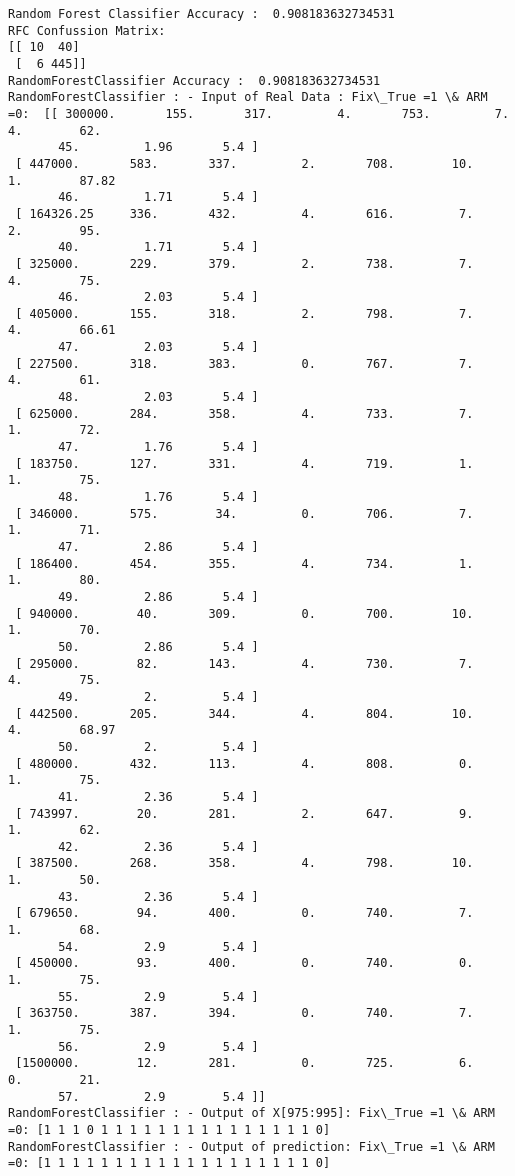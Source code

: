 \documentclass[11pt]{article}
\begin{document}
    \begin{Verbatim}[commandchars=\\\{\}]
Random Forest Classifier Accuracy :  0.908183632734531
RFC Confussion Matrix: 
[[ 10  40]
 [  6 445]]
RandomForestClassifier Accuracy :  0.908183632734531
RandomForestClassifier : - Input of Real Data : Fix\_True =1 \& ARM =0:  [[ 300000.       155.       317.         4.       753.         7.         4.        62.
       45.         1.96       5.4 ]
 [ 447000.       583.       337.         2.       708.        10.         1.        87.82
       46.         1.71       5.4 ]
 [ 164326.25     336.       432.         4.       616.         7.         2.        95.
       40.         1.71       5.4 ]
 [ 325000.       229.       379.         2.       738.         7.         4.        75.
       46.         2.03       5.4 ]
 [ 405000.       155.       318.         2.       798.         7.         4.        66.61
       47.         2.03       5.4 ]
 [ 227500.       318.       383.         0.       767.         7.         4.        61.
       48.         2.03       5.4 ]
 [ 625000.       284.       358.         4.       733.         7.         1.        72.
       47.         1.76       5.4 ]
 [ 183750.       127.       331.         4.       719.         1.         1.        75.
       48.         1.76       5.4 ]
 [ 346000.       575.        34.         0.       706.         7.         1.        71.
       47.         2.86       5.4 ]
 [ 186400.       454.       355.         4.       734.         1.         1.        80.
       49.         2.86       5.4 ]
 [ 940000.        40.       309.         0.       700.        10.         1.        70.
       50.         2.86       5.4 ]
 [ 295000.        82.       143.         4.       730.         7.         4.        75.
       49.         2.         5.4 ]
 [ 442500.       205.       344.         4.       804.        10.         4.        68.97
       50.         2.         5.4 ]
 [ 480000.       432.       113.         4.       808.         0.         1.        75.
       41.         2.36       5.4 ]
 [ 743997.        20.       281.         2.       647.         9.         1.        62.
       42.         2.36       5.4 ]
 [ 387500.       268.       358.         4.       798.        10.         1.        50.
       43.         2.36       5.4 ]
 [ 679650.        94.       400.         0.       740.         7.         1.        68.
       54.         2.9        5.4 ]
 [ 450000.        93.       400.         0.       740.         0.         1.        75.
       55.         2.9        5.4 ]
 [ 363750.       387.       394.         0.       740.         7.         1.        75.
       56.         2.9        5.4 ]
 [1500000.        12.       281.         0.       725.         6.         0.        21.
       57.         2.9        5.4 ]]
RandomForestClassifier : - Output of X[975:995]: Fix\_True =1 \& ARM =0: [1 1 1 0 1 1 1 1 1 1 1 1 1 1 1 1 1 1 1 0]
RandomForestClassifier : - Output of prediction: Fix\_True =1 \& ARM =0: [1 1 1 1 1 1 1 1 1 1 1 1 1 1 1 1 1 1 1 0]


\end{Verbatim}
\end{document}
